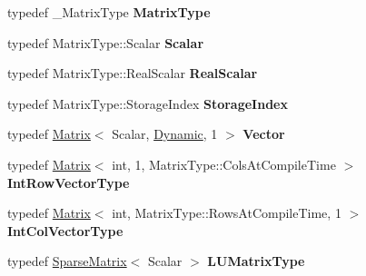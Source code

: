 \begin{DoxyCompactItemize}
\mbox{\label{class_eigen_1_1_umf_pack_l_u_aa85376b53299c17d415b99a48ad64f76}} 
typedef \+\_\+\+Matrix\+Type {\bfseries Matrix\+Type}
\item 
\mbox{\label{class_eigen_1_1_umf_pack_l_u_a625a5b4478cb698e878db8ca83785371}} 
typedef Matrix\+Type\+::\+Scalar {\bfseries Scalar}
\item 
\mbox{\label{class_eigen_1_1_umf_pack_l_u_a578eb1ae6d86e048cf4ca1d3ef5b2267}} 
typedef Matrix\+Type\+::\+Real\+Scalar {\bfseries Real\+Scalar}
\item 
\mbox{\label{class_eigen_1_1_umf_pack_l_u_a8514e6012b9f99251e088cb4a5188408}} 
typedef Matrix\+Type\+::\+Storage\+Index {\bfseries Storage\+Index}
\item 
\mbox{\label{class_eigen_1_1_umf_pack_l_u_a8be64e184384e92d68b90ed69ae8e20c}} 
typedef \hyperlink{group___core___module_class_eigen_1_1_matrix}{Matrix}$<$ Scalar, \hyperlink{namespace_eigen_ad81fa7195215a0ce30017dfac309f0b2}{Dynamic}, 1 $>$ {\bfseries Vector}
\item 
\mbox{\label{class_eigen_1_1_umf_pack_l_u_a90d91ae46799346e6352a78e3500adcf}} 
typedef \hyperlink{group___core___module_class_eigen_1_1_matrix}{Matrix}$<$ int, 1, Matrix\+Type\+::\+Cols\+At\+Compile\+Time $>$ {\bfseries Int\+Row\+Vector\+Type}
\item 
\mbox{\label{class_eigen_1_1_umf_pack_l_u_ac0bc3049980785317785bbe428a4e2e9}} 
typedef \hyperlink{group___core___module_class_eigen_1_1_matrix}{Matrix}$<$ int, Matrix\+Type\+::\+Rows\+At\+Compile\+Time, 1 $>$ {\bfseries Int\+Col\+Vector\+Type}
\item 
\mbox{\label{class_eigen_1_1_umf_pack_l_u_acc3edb274787854495c951c4e05a9265}} 
typedef \hyperlink{group___sparse_core___module_class_eigen_1_1_sparse_matrix}{Sparse\+Matrix}$<$ Scalar $>$ {\bfseries L\+U\+Matrix\+Type}
\item 
\mbox{\label{class_eigen_1_1_umf_pack_l_u_ad00daeabee40de549ce6a03de88ddb33}} 

\end{DoxyCompactItemize}
